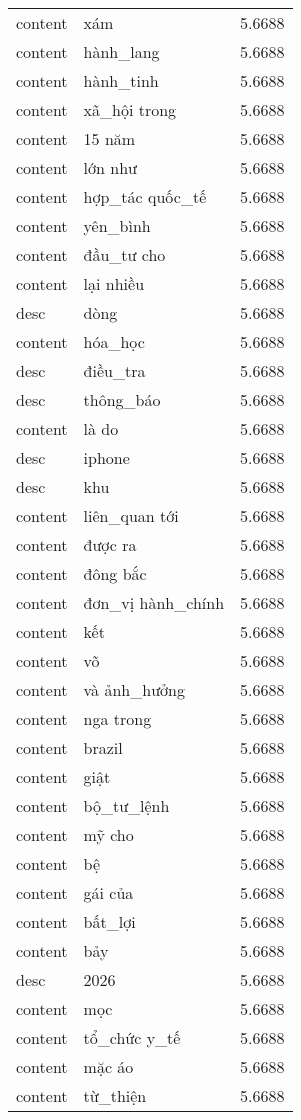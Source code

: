 \documentclass{article}
\begin{document}
\begin{tabular}{lll}
content & xám & 5.6688\\
content & hành\_lang & 5.6688\\
content & hành\_tinh & 5.6688\\
content & xã\_hội trong & 5.6688\\
content & 15 năm & 5.6688\\
content & lớn như & 5.6688\\
content & hợp\_tác quốc\_tế & 5.6688\\
content & yên\_bình & 5.6688\\
content & đầu\_tư cho & 5.6688\\
content & lại nhiều & 5.6688\\
desc & dòng & 5.6688\\
content & hóa\_học & 5.6688\\
desc & điều\_tra & 5.6688\\
desc & thông\_báo & 5.6688\\
content & là do & 5.6688\\
desc & iphone & 5.6688\\
desc & khu & 5.6688\\
content & liên\_quan tới & 5.6688\\
content & được ra & 5.6688\\
content & đông bắc & 5.6688\\
content & đơn\_vị hành\_chính & 5.6688\\
content & kết & 5.6688\\
content & võ & 5.6688\\
content & và ảnh\_hưởng & 5.6688\\
content & nga trong & 5.6688\\
content & brazil & 5.6688\\
content & giật & 5.6688\\
content & bộ\_tư\_lệnh & 5.6688\\
content & mỹ cho & 5.6688\\
content & bệ & 5.6688\\
content & gái của & 5.6688\\
content & bất\_lợi & 5.6688\\
content & bảy & 5.6688\\
desc & 2026 & 5.6688\\
content & mọc & 5.6688\\
content & tổ\_chức y\_tế & 5.6688\\
content & mặc áo & 5.6688\\
content & từ\_thiện & 5.6688\\

\end{tabular}
\end{document}
